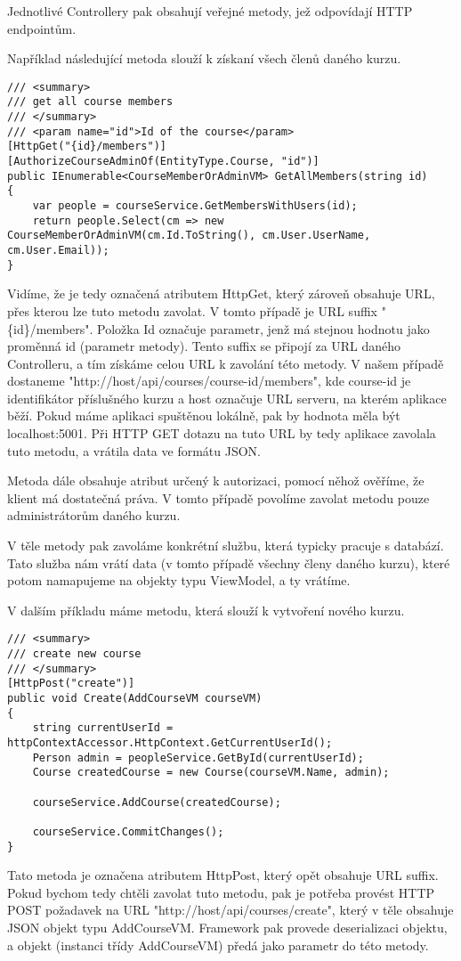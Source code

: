Jednotlivé Controllery pak obsahují veřejné metody, jež odpovídají HTTP endpointům.

Například následující metoda slouží k získaní všech členů daného kurzu.
\begin{lstlisting}
/// <summary>
/// get all course members
/// </summary>
/// <param name="id">Id of the course</param>
[HttpGet("{id}/members")]
[AuthorizeCourseAdminOf(EntityType.Course, "id")]
public IEnumerable<CourseMemberOrAdminVM> GetAllMembers(string id)
{
	var people = courseService.GetMembersWithUsers(id);
	return people.Select(cm => new CourseMemberOrAdminVM(cm.Id.ToString(), cm.User.UserName, cm.User.Email));
}
\end{lstlisting}

Vidíme, že je tedy označená atributem HttpGet, který zároveň obsahuje URL, přes kterou lze tuto metodu zavolat. V tomto případě je URL suffix "\{id\}/members". Položka Id označuje parametr, jenž má stejnou hodnotu jako proměnná id (parametr metody). Tento suffix se připojí za URL daného Controlleru, a tím získáme celou URL k zavolání této metody. V našem případě dostaneme
\newline
"http://host/api/courses/course-id/members", kde course-id je identifikátor příslušného kurzu a host označuje URL serveru, na kterém aplikace běží. Pokud máme aplikaci spuštěnou lokálně, pak by hodnota měla být localhost:5001. Při HTTP GET dotazu na tuto URL by tedy aplikace zavolala tuto metodu, a vrátila data ve formátu JSON.

Metoda dále obsahuje atribut určený k autorizaci, pomocí něhož ověříme, že klient má dostatečná práva. V tomto případě povolíme zavolat metodu pouze administrátorům daného kurzu.

V těle metody pak zavoláme konkrétní službu, která typicky pracuje s databází. Tato služba nám vrátí data (v tomto případě všechny členy daného kurzu), které potom namapujeme na objekty typu ViewModel, a ty vrátíme.

\vspace{\baselineskip}

V dalším příkladu máme metodu, která slouží k vytvoření nového kurzu.
\begin{lstlisting}
/// <summary>
/// create new course
/// </summary>
[HttpPost("create")]
public void Create(AddCourseVM courseVM)
{
	string currentUserId = httpContextAccessor.HttpContext.GetCurrentUserId();
	Person admin = peopleService.GetById(currentUserId);
	Course createdCourse = new Course(courseVM.Name, admin);
	
	courseService.AddCourse(createdCourse);
	
	courseService.CommitChanges();
}
\end{lstlisting}
Tato metoda je označena atributem HttpPost, který opět obsahuje URL suffix. Pokud bychom tedy chtěli zavolat tuto metodu, pak je potřeba provést HTTP POST požadavek na URL
\newline
"http://host/api/courses/create", který v těle obsahuje JSON objekt typu AddCourseVM. Framework pak provede deserializaci objektu, a objekt (instanci třídy AddCourseVM) předá jako parametr do této metody.

